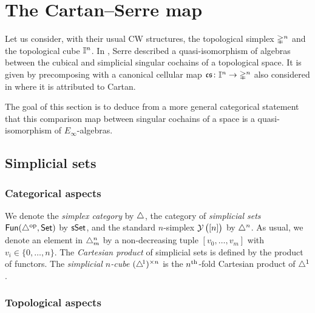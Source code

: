 
\section{The Cartan--Serre map} \label{s:comparison}

Let us consider, with their usual CW structures, the topological simplex $\mathbb{\Delta}^n$ and the topological cube $\mathbb{I}^n$.
In \cite[p. 442]{serre1951homologie}, Serre described a quasi-isomorphism of algebras between the cubical and simplicial singular cochains of a topological space.
It is given by precomposing with a canonical cellular map $\operatorname{\mathfrak{cs}} \colon \mathbb{I}^n \to \mathbb{\Delta}^n$ also considered in \cite[p.199]{eilenberg1953acyclic} where it is attributed to Cartan.

The goal of this section is to deduce from a more general categorical statement that this comparison map between singular cochains of a space is a quasi-isomorphism of $E_\infty$-algebras.

\subsection{Simplicial sets} \label{ss:simplicial sets}

\subsubsection{Categorical aspects}

We denote the \textit{simplex category} by $\triangle$, the category of \textit{simplicial sets} $\mathsf{Fun}(\triangle^{\mathrm{op}}, \mathsf{Set})$ by $\mathsf{sSet}$, and the standard $n$-simplex $\operatorname{\mathcal{Y}} \big( [n] \big)$ by $\triangle^n$.
As usual, we denote an element in $\triangle^n_m$ by a non-decreasing tuple $[v_0, \dots, v_m]$ with $v_i \in \{0, \dots, n\}$.
The \textit{Cartesian product} of simplicial sets is defined by the product of functors.
The \textit{simplicial $n$-cube} $(\triangle^{\!1})^{\times n}$ is the $n^{\mathrm{th}}$-fold Cartesian product of $\triangle^1$.

\subsubsection{Topological aspects}

